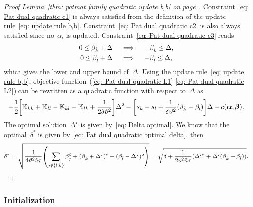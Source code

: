 \begin{proof}[Proof Lemma~\ref{thm: patmat family quadratic update b,b} on page~\pageref{thm: patmat family quadratic update b,b}]
  Constraint~\eqref{eq: Pat dual quadratic c1} is always satisfied from the definition of the update rule~\eqref{eq: update rule b,b}. Constraint~\eqref{eq: Pat dual quadratic c2} is also always satisfied since no~$\alpha_i$ is updated. Constraint~\eqref{eq: Pat dual quadratic c3} reads
  \begin{align*}
    0 \leq \beta_{\hat{k}} + \Delta
    & \quad \implies \quad
    - \beta_{\hat{k}} \leq \Delta, \\
    0 \leq \beta_{\hat{l}} + \Delta
    & \quad \implies \quad
    - \beta_{\hat{l}} \leq \Delta, \\
  \end{align*}
  which gives the lower and upper bound of~$\Delta.$ Using the update rule~\eqref{eq: update rule b,b}, objective function~(\ref{eq: Pat dual quadratic L1}-\ref{eq: Pat dual quadratic L2}) can be rewritten as a quadratic function with respect to~$\Delta$ as
  \begin{equation*}
    - \frac{1}{2} \Brac[s]{\K_{kk} + \K_{ll} - \K_{kl} - \K_{lk} + \frac{1}{2\delta\vartheta^2}} \Delta^2
    - \Brac[s]{s_k - s_l + \frac{1}{\delta\vartheta^2}(\betak - \betal)} \Delta
    - c(\bm{\alpha}, \bm{\beta}).
  \end{equation*}
  The optimal solution~$\Delta^{\star}$ is given by~\eqref{eq: Delta optimal}.   We know that the optimal~$\delta^*$ is given by~\eqref{eq: Pat dual quadratic optimal delta}, then
  \begin{equation*}
    \delta^*
      = \sqrt{\frac{1}{4\vartheta^2 \ntil \tau} \Brac{\sum_{j \notin \{\hat{l}, \hat{k}\}} \beta_j^2 + (\betak + \Delta^\star)^2 + (\betal - \Delta^\star)^2}} 
      = \sqrt{\delta + \frac{1}{2\vartheta^2 \ntil \tau} (\Delta^{\star2} + \Delta^\star (\betak - \betal))}.
  \end{equation*}
\end{proof}

\subsubsection{Initialization}